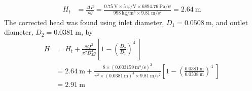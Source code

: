 \begin{align*}
    H_t &= \frac{\Delta P}{\rho g} = \frac{\qty{0.75}{\volt} \times \qty{5}{\psi\per\volt} \times \qty{6894.76}{\pascal\per\psi}}{\qty{998}{\kilo\gram\per\meter\cubed} \times \qty{9.81}{\meter\per\second\squared}} = \qty{2.64}{\meter}
\end{align*}
The corrected head was found using inlet diameter, $D_1 = \qty{0.0508}{\meter}$, and outlet diameter, $D_2 = \qty{0.0381}{\meter}$, by
\begin{align*}
    H &= H_t + \frac{8Q^2}{\pi^2 D_2^4 g} \left[1 - \left(\frac{D_2}{D_1}\right)^4\ \right] \\
    &= \qty{2.64}{\meter} + \frac{8 \times (\qty{0.003159}{\meter\cubed\per\second})^2}{\pi^2 \times (\qty{0.0381}{\meter})^4 \times \qty{9.81}{\meter\per\second\squared}} \left[1 - \left(\frac{\qty{0.0381}{\meter}}{\qty{0.0508}{\meter}}\right)^4\ \right] \\
    &= \qty{2.91}{\meter}
\end{align*}

